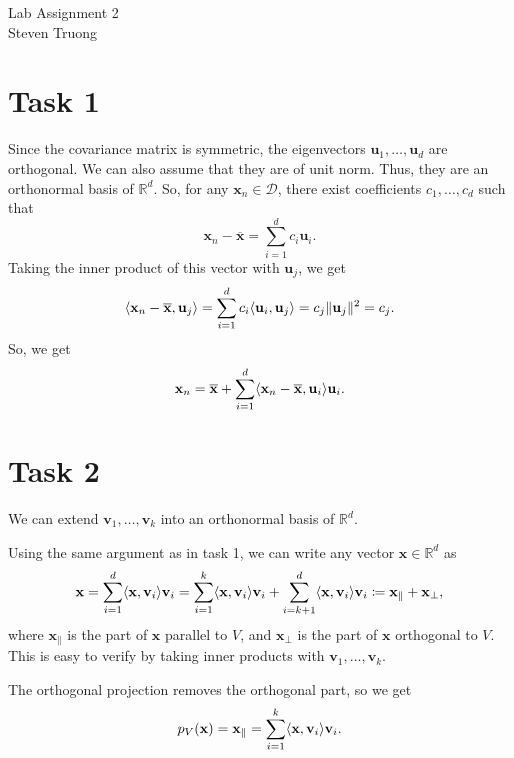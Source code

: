 \documentclass{article}
\newcommand{\R}{\mathbb{R}}
\newcommand{\mean}[1]{\overline{#1}}
\renewcommand{\vec}[1]{\mathbf{#1}}
\DeclarePairedDelimiter{\p}{(}{)}
\DeclarePairedDelimiter{\norm}{\Vert}{\Vert}
\DeclarePairedDelimiter{\inner}{\langle}{\rangle}
\begin{document}
{\huge Lab Assignment 2} \\	
\large Steven Truong \\

\section*{Task 1}
Since the covariance matrix is symmetric, the eigenvectors $\vec{u}_1, \ldots, \vec{u}_d$ are orthogonal. We can also assume that they are of unit norm. Thus, they are an orthonormal basis of $\R^d$. So, for any $\vec{x}_n \in \mathcal{D}$, there exist coefficients $c_1, \ldots, c_d$ such that
\[
	\vec{x}_n - \mean{\vec{x}} = \sum_{i=1}^d c_i\vec{u}_i.
\]
Taking the inner product of this vector with $\vec{u}_j$, we get
\[
	\inner{\vec{x}_n - \mean{\vec{x}}, \vec{u}_j} = \sum_{i=1}^d c_i\inner{\vec{u}_i, \vec{u}_j} = c_j\norm{\vec{u}_j}^2 = c_j.
\]
So, we get
\[
	\vec{x}_n = \mean{\vec{x}} + \sum_{i=1}^d \inner{\vec{x}_n - \mean{\vec{x}}, \vec{u}_i}\vec{u}_i.
\]

\section*{Task 2}
We can extend $\vec{v}_1, \ldots, \vec{v}_k$ into an orthonormal basis of $\R^d$.

Using the same argument as in task 1, we can write any vector $\vec{x} \in \R^d$ as
\[
	\vec{x} = \sum_{i=1}^d \inner{\vec{x}, \vec{v}_i}\vec{v}_i = \sum_{i=1}^k \inner{\vec{x}, \vec{v}_i}\vec{v}_i + \sum_{i=k+1}^d \inner{\vec{x}, \vec{v}_i}\vec{v}_i \coloneqq \vec{x}_\parallel + \vec{x}_\bot,
\]
where $\vec{x}_\parallel$ is the part of $\vec{x}$ parallel to $V$, and $\vec{x}_\bot$ is the part of $\vec{x}$ orthogonal to $V$. This is easy to verify by taking inner products with $\vec{v}_1, \ldots, \vec{v}_k$.

The orthogonal projection removes the orthogonal part, so we get
\[
	p_V\p{\vec{x}} = \vec{x}_\parallel = \sum_{i=1}^k \inner{\vec{x}, \vec{v}_i}\vec{v}_i.
\]
\end{document}
